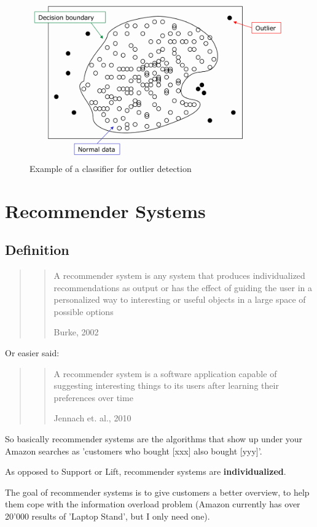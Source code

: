 \documentclass[11pt]{article}
\begin{document}
\begin{figure}[tbh!]
    \centering
    \includegraphics[width=0.5\linewidth, keepaspectratio]{Pictures/outlier_clustering_method_classification}
    \caption{Example of a classifier for outlier detection}
    \label{fig:outlierclusteringmethodclassification}
\end{figure}

\newpage

\section{Recommender Systems}

\subsection{Definition}

\begin{quote}
    \blockquote[Burke, 2002]{A recommender system is any system that produces individualized recommendations as output or has the effect of guiding the user in a personalized way to interesting or useful objects in a large space of possible options}
\end{quote}

Or easier said:

\begin{quote}
    \blockquote[Jennach et. al., 2010]{A recommender system is a software application capable of suggesting interesting things to its users after learning their preferences over time}
\end{quote}

So basically recommender systems are the algorithms that show up under your Amazon searches as 'customers who bought [xxx] also bought [yyy]'.

As opposed to Support or Lift, recommender systems are \textbf{individualized}.

\vspace{10px}

The goal of recommender systems is to give customers a better overview, to help them cope with the information overload problem (Amazon currently has over 20'000 results of 'Laptop Stand', but I only need one).
\end{document}
